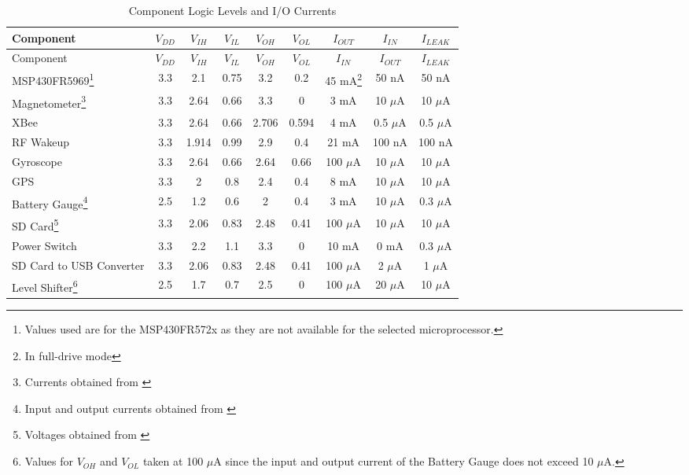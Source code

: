 \begin{center}
    \begin{longtable}{|p{1.2in}|c|c|c|c|c|c|c|c|}
    \caption{Component Logic Levels and I/O Currents  \label{tab:logicCompAndDriving}} \\
     \hline
    \rowcolor{Gray}
    Component & $V_{DD}$   & $V_{IH}$   & $V_{IL}$   & $V_{OH}$   & $V_{OL}$   & $I_{OUT}$ & $I_{IN}$ & $I_{LEAK}$\\
    \hline \hline \endfirsthead
    
         \hline
    \rowcolor{Gray}
    Component & $V_{DD}$   & $V_{IH}$   & $V_{IL}$   & $V_{OH}$   & $V_{OL}$   & $I_{IN}$ & $I_{OUT}$ & $I_{LEAK}$\\
    \hline \hline \endhead
    
    \endfoot

    MSP430FR5969\footnote{Values used are for the MSP430FR572x as they are not available for the selected microprocessor.} & 3.3   & 2.1   & 0.75  & 3.2   & 0.2   & 45 mA\footnote{In full-drive mode} & 50 nA & 50 nA \\ \hline
 
    Magnetometer\footnote{Currents obtained from \cite{i2cStandard}} & 3.3   & 2.64  & 0.66  & 3.3   & 0    & 3 mA & 10 $\mu$A & 10 $\mu$A  \\ \hline

    XBee  & 3.3   & 2.64   & 0.66   & 2.706   & 0.594  & 4 mA & 0.5 $\mu$A & 0.5 $\mu$A \\ \hline

    RF Wakeup & 3.3   & 1.914 & 0.99  & 2.9   & 0.4  & 21 mA & 100 nA & 100 nA \\ \hline

    Gyroscope & 3.3   & 2.64  & 0.66  & 2.64  & 0.66  & 100 $\mu$A & 10 $\mu$A & 10 $\mu$A \\ \hline

    GPS   & 3.3   & 2     & 0.8   & 2.4   & 0.4 &  8 mA & 10 $\mu$A &  10 $\mu$A  \\ \hline

    Battery Gauge\footnote{Input and output currents obtained from \cite{i2cStandard}} & 2.5   & 1.2   & 0.6   & 2 & 0.4  & 3 mA & 10 $\mu$A & 0.3 $\mu$A \\ \hline

    SD Card\footnote{Voltages obtained from \cite{ibrahim2010sd}} & 3.3 & 2.06   & 0.83   & 2.48   & 0.41 &100 $\mu$A & 10 $\mu$A &  10 $\mu$A\\ \hline

    Power Switch & 3.3   & 2.2   & 1.1   & 3.3   & 0    & 10 mA & 0 mA & 0.3 $\mu$A\\ \hline

    SD Card to USB Converter & 3.3 & 2.06   & 0.83   & 2.48   & 0.41   & 100 $\mu$A & 2 $\mu$A & 1 $\mu$A \\ \hline	
    Level Shifter\footnote{Values for $V_{OH}$ and $V_{OL}$ taken at 100 $\mu$A since the input and output current of the Battery Gauge does not exceed 10 $\mu$A.}& 2.5 & 1.7   & 0.7   & 2.5   & 0   & 100 $\mu$A & 20 $\mu$A & 10 $\mu$A \\ \hline	
    \end{longtable}%

\end{center}%

